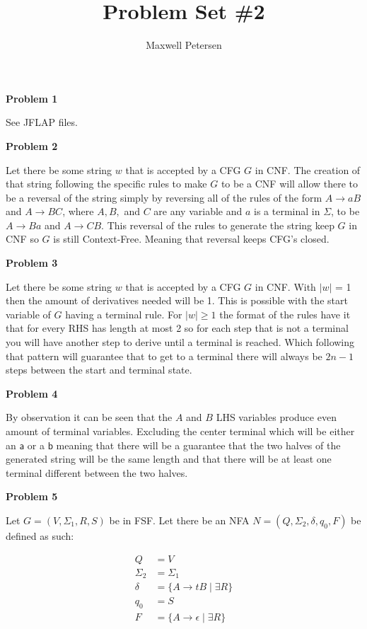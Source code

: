 \documentclass[letterpaper,12pt]{article}
\title{Problem Set \#2}
\author{Maxwell Petersen}
\makeatletter
\newcommand\exercise[1]{\par\vspace{4ex}\normalfont\normalsize\noindent
\textbf{\large Problem #1}\par\nobreak\@afterindentfalse\@afterheading}
\makeatother
\begin{document}
\maketitle

\exercise{1}
See JFLAP files.

\exercise{2}
Let there be some string $w$ that is accepted by a CFG $G$ in CNF. The creation of that string following the specific rules to make $G$ to be a CNF will allow there to be a reversal of the string simply by reversing all of the rules of the form $A \rightarrow aB$ and $A \rightarrow BC$, where $A,B,$ and $C$ are any variable and $a$ is a terminal in $\Sigma$, to be $A \rightarrow Ba$ and $A \rightarrow CB$. This reversal of the rules to generate the string keep $G$ in CNF so $G$ is still Context-Free. Meaning that reversal keeps CFG's closed.

\exercise{3}
Let there be some string $w$ that is accepted by a CFG $G$ in CNF. With $|w|$ = 1 then the amount of derivatives needed will be 1. This is possible with the start variable of $G$ having a terminal rule. For $|w| \geq 1$ the format of the rules have it that for every RHS has length at most 2 so for each step that is not a terminal you will have another step to derive until a terminal is reached. Which following that pattern will guarantee that to get to a terminal there will always be $2n -1$ steps between the start and terminal state.

\exercise{4}
By observation it can be seen that the $A$ and $B$ LHS variables produce even amount of terminal variables. Excluding the center terminal which will be either an $\textsf{a}$ or a $\textsf{b}$  meaning that there will be a guarantee that the two halves of the generated string will be the same length and that there will be at least one terminal different between the two halves.
\cleardoublepage

\exercise{5}
Let $G = (V, \Sigma_1, R, S)$ be in FSF. Let there be an NFA $N = (Q, \Sigma_2, \delta, q_0, F)$ be defined as such:

\begin{align*}
Q &= V\\
\Sigma_2 &= \Sigma_1 \\
\delta &= \{ A \rightarrow tB\mid \exists R\} \\
q_0 &= S\\
F &= \{A \rightarrow \epsilon\mid \exists R\}
\end{align*}
\end{document}
